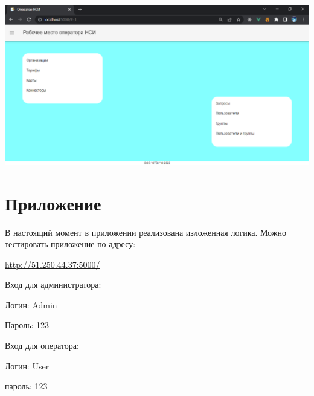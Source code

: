\documentclass[12pt, a4paper]{article}
\begin{document}
\begin{center}
    \includegraphics [width=\textwidth] {p5.png}
\end{center}

\section{Приложение}
В настоящий момент в приложении реализована изложенная логика. Можно тестировать приложение по адресу:

\url{http://51.250.44.37:5000/}

Вход для администратора:

Логин: Admin

Пароль: 123

Вход для оператора:

Логин: User

пароль: 123
\end{document}
